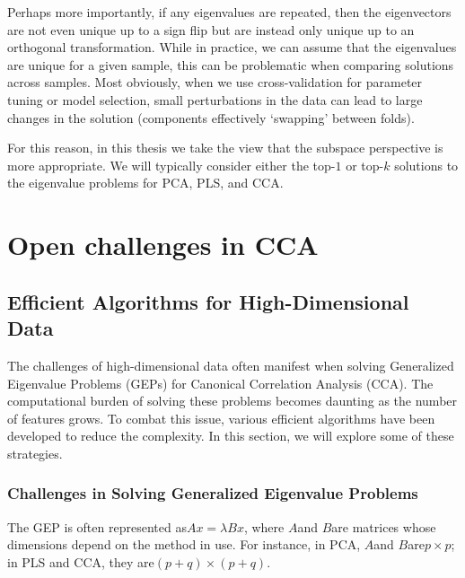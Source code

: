 Perhaps more importantly, if any eigenvalues are repeated, then the eigenvectors are not even unique up to a sign flip
but are instead only unique up to an orthogonal transformation.
While in practice, we can assume that the eigenvalues are unique for a given sample, this can be problematic when comparing solutions across samples.
Most obviously, when we use cross-validation for parameter tuning or model selection, small perturbations in the data
can lead to large changes in the solution (components effectively `swapping' between folds).

For this reason, in this thesis we take the view that the subspace perspective is more appropriate. We will typically
consider either the top-$1$ or top-$k$ solutions to the eigenvalue problems for PCA, PLS, and CCA.

\section{Open challenges in CCA}

\subsection{Efficient Algorithms for High-Dimensional Data}

The challenges of high-dimensional data often manifest when solving Generalized Eigenvalue Problems (GEPs) for Canonical Correlation Analysis (CCA). The computational burden of solving these problems becomes daunting as the number of features grows. To combat this issue, various efficient algorithms have been developed to reduce the complexity. In this section, we will explore some of these strategies.

\subsubsection{Challenges in Solving Generalized Eigenvalue Problems}

The GEP is often represented as\( Ax = \lambda Bx \), where \( A \)and \( B \)are matrices whose dimensions depend on the method in use.
For instance, in PCA, \( A \)and \( B \)are\( p \times p \); in PLS and CCA, they are\( (p+q) \times (p+q) \).

